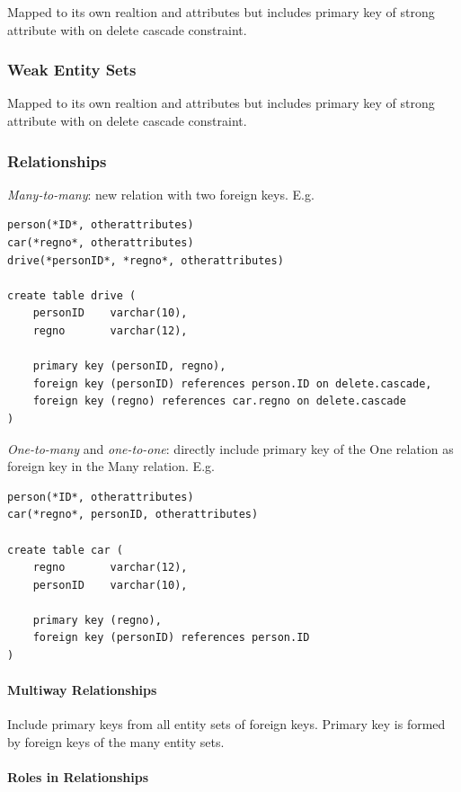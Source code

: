 \documentclass[twocolumn,english]{article}
\begin{document}
Mapped to its own realtion and attributes but includes primary key
of strong attribute with on delete cascade constraint.


\subsubsection{Weak Entity Sets}

Mapped to its own realtion and attributes but includes primary key
of strong attribute with on delete cascade constraint.


\subsubsection{Relationships}

\emph{Many-to-many}: new relation with two foreign keys. E.g.

\begin{lstlisting}
person(*ID*, otherattributes)
car(*regno*, otherattributes)
drive(*personID*, *regno*, otherattributes)

create table drive (
	personID    varchar(10),
	regno       varchar(12),

	primary key (personID, regno),
	foreign key (personID) references person.ID on delete.cascade,
	foreign key (regno) references car.regno on delete.cascade
)
\end{lstlisting}


\noindent \emph{One-to-many} and \emph{one-to-one}: directly include
primary key of the One relation as foreign key in the Many relation.
E.g.

\begin{lstlisting}
person(*ID*, otherattributes)
car(*regno*, personID, otherattributes)

create table car (
	regno       varchar(12),
	personID    varchar(10),

	primary key (regno),
	foreign key (personID) references person.ID
)
\end{lstlisting}



\paragraph{Multiway Relationships}

Include primary keys from all entity sets of foreign keys. Primary
key is formed by foreign keys of the many entity sets.


\paragraph{Roles in Relationships}
\end{document}
